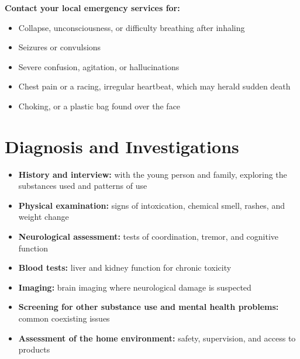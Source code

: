 \textbf{Contact your local emergency services for:}
\begin{itemize}
    \item Collapse, unconsciousness, or difficulty breathing after inhaling
    \item Seizures or convulsions
    \item Severe confusion, agitation, or hallucinations
    \item Chest pain or a racing, irregular heartbeat, which may herald sudden death
    \item Choking, or a plastic bag found over the face
\end{itemize}

\section*{Diagnosis and Investigations}
\begin{itemize}
    \item \textbf{History and interview:} with the young person and family, exploring the substances used and patterns of use
    \item \textbf{Physical examination:} signs of intoxication, chemical smell, rashes, and weight change
    \item \textbf{Neurological assessment:} tests of coordination, tremor, and cognitive function
    \item \textbf{Blood tests:} liver and kidney function for chronic toxicity
    \item \textbf{Imaging:} brain imaging where neurological damage is suspected
    \item \textbf{Screening for other substance use and mental health problems:} common coexisting issues
    \item \textbf{Assessment of the home environment:} safety, supervision, and access to products
\end{itemize}

